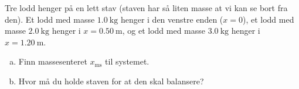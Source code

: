 %
Tre lodd henger på en lett stav (staven har så liten masse at vi kan se bort fra den). Et lodd med masse $\SI{1.0}{\kilo\gram}$ henger i den venstre enden ($x = 0$), et lodd med masse $\SI{2.0}{\kilo\gram}$ henger i $x = \SI{0.50}{\metre}$, og et lodd med masse $\SI{3.0}{\kilo\gram}$ henger i $x = \SI{1.20}{\metre}$.
\begin{enumerate}[a)]
    \item Finn massesenteret $x_\text{ms}$ til systemet.
    \item Hvor må du holde staven for at den skal balansere?
\end{enumerate}
